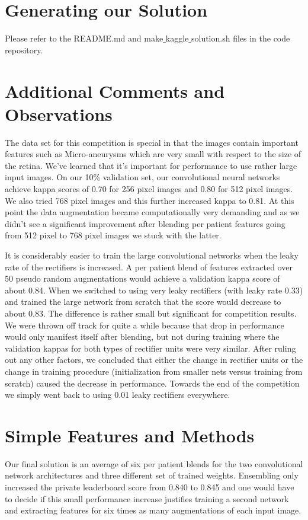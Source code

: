 \documentclass[12pt,a4paper]{scrartcl}
\begin{document}
\section{Generating our Solution}
Please refer to the README.md and make$\_$kaggle$\_$solution.sh files in the code repository.

\section{Additional Comments and Observations}
The data set for this competition is special in that the images contain important features such as Micro-aneurysms which are very small with respect to the size of the retina. We've learned that it's important for performance to use rather large input images. On our 10\% validation set, our convolutional neural networks achieve kappa scores of 0.70 for 256 pixel images and 0.80 for 512 pixel images. We also tried 768 pixel images and this further increased kappa to 0.81. At this point the data augmentation became computationally very demanding and as we didn't see a significant improvement after blending per patient features going from 512 pixel to 768 pixel images we stuck with the latter.

It is considerably easier to train the large convolutional networks when the leaky rate of the rectifiers is increased. A per patient blend of features extracted over 50 pseudo random augmentations would achieve a validation kappa score of about 0.84. When we switched to using very leaky rectifiers (with leaky rate 0.33) and trained the large network from scratch that the score would decrease to about 0.83. The difference is rather small but significant for competition results. We were thrown off track for quite a while because that drop in performance would only manifest itself after blending, but not during training where the validation kappas for both types of rectifier units were very similar. After ruling out any other factors, we concluded that either the change in rectifier units or the change in training procedure (initialization from smaller nets versus training from scratch) caused the decrease in performance. Towards the end of the competition we simply went back to using 0.01 leaky rectifiers everywhere.
%
\section{Simple Features and Methods}
Our final solution is an average of six per patient blends for the two convolutional network architectures and three different set of trained weights. Ensembling only increased the private leaderboard score from 0.840 to 0.845 and one would have to decide if this small performance increase justifies training a second network and extracting features for six times as many augmentations of each input image.
\end{document}
